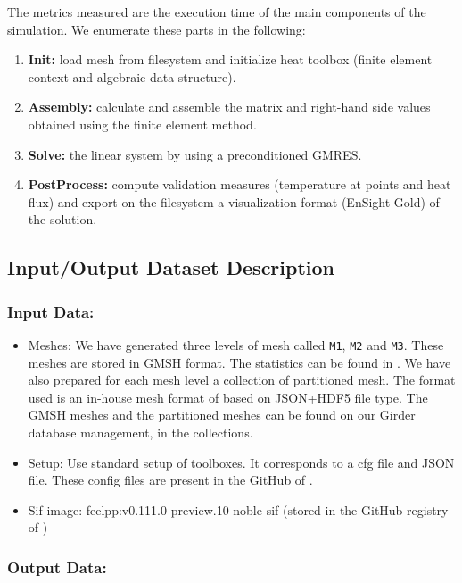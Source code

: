 The metrics measured are the execution time of the main components of the simulation.
We enumerate these parts in the following:
\begin{enumerate}
\item \textbf{Init:} load mesh from filesystem and initialize heat toolbox (finite element context and algebraic data structure).
\item \textbf{Assembly:} calculate and assemble the matrix and right-hand side values obtained using the finite element method.
\item \textbf{Solve:} the linear system by using a preconditioned GMRES.
\item \textbf{PostProcess:} compute validation measures (temperature at points and heat flux) and export on the filesystem a visualization format (EnSight Gold) of the solution.
\end{enumerate}




\subsection{Input/Output Dataset Description}


\subsubsection{Input Data:}
  \begin{itemize}
  \item Meshes: We have generated three levels of mesh called \texttt{M1}, \texttt{M2}
    and \texttt{M3}. These meshes are stored in GMSH format. The statistics can be found in . We have also prepared for
    each mesh level a collection of partitioned mesh.
    The format used is an in-house mesh format of \Feelpp based on
    JSON+HDF5 file type.
    The GMSH meshes and the partitioned meshes can be found on our Girder
    database management, in the \Feelpp collections.
  \item Setup: Use standard setup of \Feelpp toolboxes. It corresponds to a cfg
    file and JSON file. These config files are present in the GitHub of \Feelpp.
  \item Sif image: feelpp:v0.111.0-preview.10-noble-sif  (stored in the GitHub registry of \Feelpp)
  \end{itemize}

\subsubsection{Output Data:}

